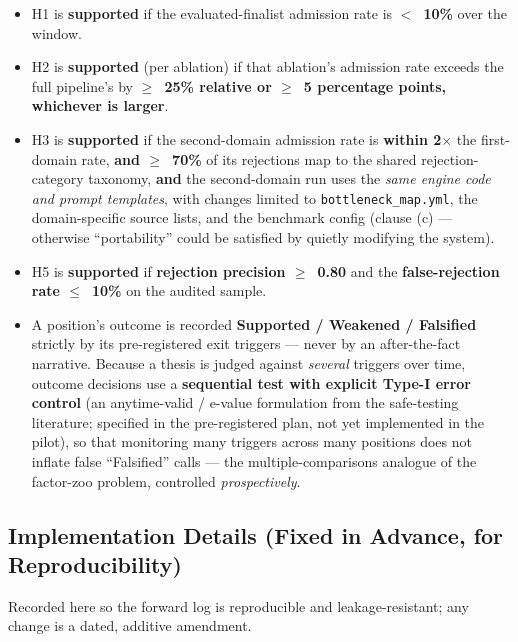 \documentclass[11pt]{article}
\begin{document}
\begin{itemize}
  \item H1 is \textbf{supported} if the evaluated-finalist admission rate is \textbf{$<$~10\%}
    over the window.
  \item H2 is \textbf{supported} (per ablation) if that ablation's admission rate exceeds the
    full pipeline's by \textbf{$\geq$~25\% relative or $\geq$~5 percentage points, whichever is
    larger}.
  \item H3 is \textbf{supported} if the second-domain admission rate is \textbf{within
    2$\times$} the first-domain rate, \textbf{and $\geq$~70\%} of its rejections map to the shared
    rejection-category taxonomy, \textbf{and} the second-domain run uses the \emph{same engine code
    and prompt templates}, with changes limited to \texttt{bottleneck\_map.yml}, the domain-specific
    source lists, and the benchmark config (clause (c) --- otherwise ``portability'' could be
    satisfied by quietly modifying the system).
  \item H5 is \textbf{supported} if \textbf{rejection precision $\geq$~0.80} and the
    \textbf{false-rejection rate $\leq$~10\%} on the audited sample.
  \item A position's outcome is recorded \textbf{Supported / Weakened / Falsified} strictly by
    its pre-registered exit triggers --- never by an after-the-fact narrative. Because a thesis is
    judged against \emph{several} triggers over time, outcome decisions use a \textbf{sequential
    test with explicit Type-I error control} (an anytime-valid / e-value formulation from the
    safe-testing literature; specified in the pre-registered plan, not yet implemented in the pilot),
    so that monitoring many triggers across many positions does not
    inflate false ``Falsified'' calls --- the multiple-comparisons analogue of the factor-zoo
    problem, controlled \emph{prospectively}.
\end{itemize}

\subsection*{Implementation Details (Fixed in Advance, for Reproducibility)}

Recorded here so the forward log is reproducible and leakage-resistant; any change is a dated,
additive amendment.
\end{document}
